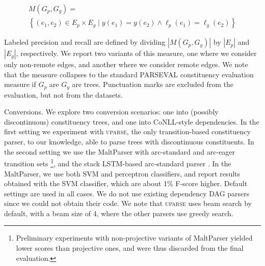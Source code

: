 \documentclass[11pt]{article}
\makeatletter
\renewcommand{\paragraph}{
  \@startsection{paragraph}{4}
  {\z@}{.5ex \@plus .5ex \@minus .2ex}{-1em}
  {\normalfont\normalsize\bfseries}
}
\makeatother
\begin{document}
\vspace{-.6cm}

{\small
\begin{multline*}
    M(G_p,G_g) = \\
    \left\{(e_1,e_2) \in E_p \times E_g \;|\;
    y(e_1) = y(e_2) \wedge \ell_p(e_1)=\ell_g(e_2)\right\}
\end{multline*}
}

\vspace{-.6cm}

Labeled precision and recall are defined by dividing $|M(G_p,G_g)|$ by $|E_p|$ and $|E_g|$, respectively.
We report two variants of this measure, one where we consider only non-remote edges,
and another where we consider remote edges. We note that the measure collapses to the standard
PARSEVAL constituency evaluation measure if $G_p$ are $G_g$ are trees.
Punctuation marks are excluded from the evaluation, but not from the datasets.


\paragraph{Conversions.}
We explore two conversion scenarios: one into (possibly discontinuous) constituency trees,
and one into CoNLL-style dependencies. In the first setting we experiment with \textsc{uparse},
the only transition-based constituency parser, to our knowledge, able to parse trees with
discontinuous constituents.
In the second setting we use the MaltParser with arc-standard and
arc-eager transition sets \cite{nivre2007maltparser}\footnote{Preliminary
experiments with non-projective variants of MaltParser yielded lower scores than
projective ones, and were thus discarded from the final evaluation.},
and the stack LSTM-based arc-standard parser \cite{dyer2015transition}.
In the MaltParser, we use both SVM and perceptron classifiers, and report
results obtained with the SVM classifier, which are about 1\% F-score higher.
Default settings are used in all cases.
We do not use existing dependency DAG parsers since we could not obtain their code.
We note that \textsc{uparse} uses beam search by default,
with a beam size of 4, where the other parsers use greedy search.

\end{document}
